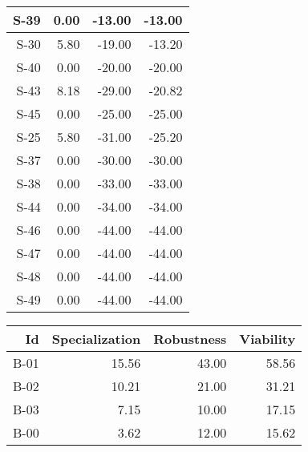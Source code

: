 \begin{tabular}{ | r | r | r | r | }
    \hline
                  S-39  &            0.00  &          -13.00  &          -13.00  \\
    \hline
                  S-30  &            5.80  &          -19.00  &          -13.20  \\
    \hline
                  S-40  &            0.00  &          -20.00  &          -20.00  \\
    \hline
                  S-43  &            8.18  &          -29.00  &          -20.82  \\
    \hline
                  S-45  &            0.00  &          -25.00  &          -25.00  \\
    \hline
                  S-25  &            5.80  &          -31.00  &          -25.20  \\
    \hline
                  S-37  &            0.00  &          -30.00  &          -30.00  \\
    \hline
                  S-38  &            0.00  &          -33.00  &          -33.00  \\
    \hline
                  S-44  &            0.00  &          -34.00  &          -34.00  \\
    \hline
                  S-46  &            0.00  &          -44.00  &          -44.00  \\
    \hline
                  S-47  &            0.00  &          -44.00  &          -44.00  \\
    \hline
                  S-48  &            0.00  &          -44.00  &          -44.00  \\
    \hline
                  S-49  &            0.00  &          -44.00  &          -44.00  \\
    \hline
\end{tabular}


\begin{tabular}{ | r | r | r | r | }
    \hline
                    Id  &  Specialization  &      Robustness  &       Viability  \\
    \hline
    \hline
                  B-01  &           15.56  &           43.00  &           58.56  \\
    \hline
                  B-02  &           10.21  &           21.00  &           31.21  \\
    \hline
                  B-03  &            7.15  &           10.00  &           17.15  \\
    \hline
                  B-00  &            3.62  &           12.00  &           15.62  \\
    \hline
\end{tabular}


